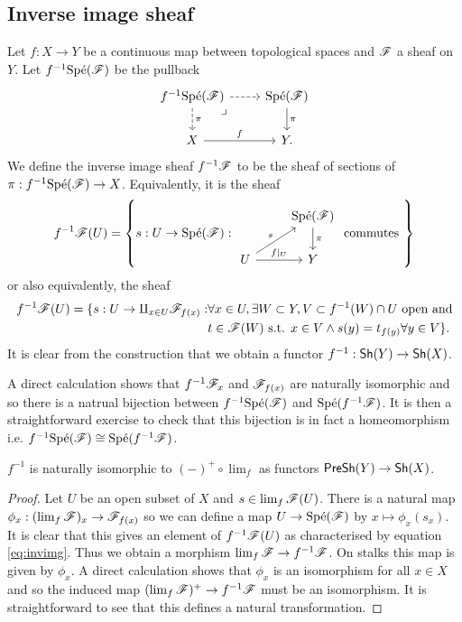 \documentclass{memoir}
\begin{document}
\subsection{Inverse image sheaf}
Let $f:X\to Y$ be a continuous map between topological spaces and $\mathscr{F}$ a sheaf on $Y$.
Let $f^{-1}\text{Sp\'e}(\mathscr{F})$ be the pullback 
\begin{equation}
    \begin{tikzcd}
        f^{-1}\Spe(\shf{F}) \arrow[r,dashed] \arrow[d,dashed,"\pi"] \arrow[dr, phantom, "\lrcorner", very near start] & \Spe(\shf{F}) \arrow[d,"\pi"] \\
        X \arrow[r,"f"] & Y.
    \end{tikzcd}
\end{equation}
We define the inverse image sheaf $f^{-1}\mathscr{F}$ to be the sheaf of sections of $\pi:f^{-1}\text{Sp\'e}(\mathscr{F})\to X$.
Equivalently, it is the sheaf
\begin{equation}
    \label{eq:invimg}
    f^{-1}\shf{F}(U) = \left\{s:U\to\Spe(\shf{F}): 
    \begin{tikzcd}
        & \Spe(\shf{F}) \arrow[d,"\pi"] \\
        U \arrow[r,"f|_U"] \arrow[ur,"s"] & Y
    \end{tikzcd} 
    \text{ commutes }
    \right\}
\end{equation}
or also equivalently, the sheaf
\begin{align}
    f^{-1}\mathscr{F}(U) = \{s:U\to\amalg_{x\in U}\mathscr{F}_{f(x)} : & \forall x\in U, \exists W\subset Y, V\subset f^{-1}(W)\cap U \text{ open and} \nonumber \\
                                                             & t\in\mathscr{F}(W) \text{ s.t. } x\in V \wedge  s(y) = t_{f(y)} \forall y\in V\}.
\end{align}
It is clear from the construction that we obtain a functor $f^{-1}:{\normalfont\mathsf{Sh}}(Y)\to{\normalfont\mathsf{Sh}}(X)$.
\begin{remark}
    A direct calculation shows that $f^{-1}\mathscr{F}_x$ and $\mathscr{F}_{f(x)}$ are naturally isomorphic and so there is a natrual bijection between $f^{-1}\text{Sp\'e}(\mathscr{F})$ and $\text{Sp\'e}(f^{-1}\mathscr{F})$.
    It is then a straightforward exercise to check that this bijection is in fact a homeomorphism i.e. $f^{-1}\text{Sp\'e}(\mathscr{F})\cong\text{Sp\'e}(f^{-1}\mathscr{F})$.
\end{remark}
\begin{thm}
    $f^{-1}$ is naturally isomorphic to $(-)^+\circ \lim_f$ as functors ${\normalfont\mathsf{PreSh}}(Y)\to {\normalfont\mathsf{Sh}}(X)$.
\end{thm}
\begin{proof}
    Let $U$ be an open subset of $X$ and $s\in\lim_f\mathscr{F}(U)$.
    There is a natural map $\phi_x:(\lim_f\mathscr{F})_x\to\mathscr{F}_{f(x)}$ so we can define a map $U\to\text{Sp\'e}(\mathscr{F})$ by $x\mapsto \phi_x(s_x)$.
    It is clear that this gives an element of $f^{-1}\mathscr{F}(U)$ as characterised by equation \ref{eq:invimg}.
    Thus we obtain a morphism $\lim_f\mathscr{F}\to f^{-1}\mathscr{F}$.
    On stalks this map is given by $\phi_x$.
    A direct calculation shows that $\phi_x$ is an isomorphism for all $x\in X$ and so the induced map $(\lim_f\mathscr{F})^+\to f^{-1}\mathscr{F}$ must be an isomorphism.
    It is straightforward to see that this defines a natural transformation.
\end{proof}
\end{document}
